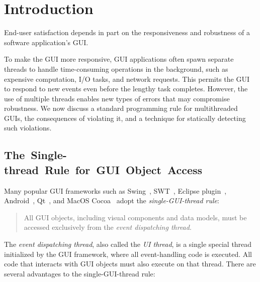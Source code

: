 \section{Introduction}
\label{sec:introduction}

End-user satisfaction depends in part on the responsiveness and
robustness of a software application's GUI.

To make the GUI more responsive, 
GUI applications often spawn separate threads to handle time-consuming
operations in the background, such as expensive computation, I/O tasks,
and network requests. This permits the GUI to respond to new events
even before the lengthy task completes. However, the use of multiple threads
enables new types of errors that may compromise robustness.
We now discuss a standard programming rule for multithreaded GUIs, the consequences
of violating it, and a technique for statically detecting such violations.



\subsection{\hspace{-1.1ex}\mbox{The}~\mbox{Single-thread}~\mbox{Rule}~\mbox{for}~\mbox{GUI}~\mbox{Object}~\mbox{Access}}

Many popular GUI frameworks such as Swing~\cite{swing}, SWT~\cite{swt}, Eclipse plugin~\cite{eclipse},
Android~\cite{android}, Qt~\cite{qt}, and MacOS Cocoa~\cite{macos}
adopt the \textit{single-GUI-thread rule}:

\vspace{-2mm}

\begin{quote}
All GUI objects, including visual components and data models, must be
 accessed exclusively from the \textit{event dispatching thread}.
\end{quote}

\vspace{-2mm}

The \textit{event dispatching thread}, also called the \textit{UI thread}, is a single
special thread initialized by the GUI framework, where all event-handling code
is executed. All code that interacts with GUI objects must also
execute on that thread.  There are several advantages to the single-GUI-thread rule:

